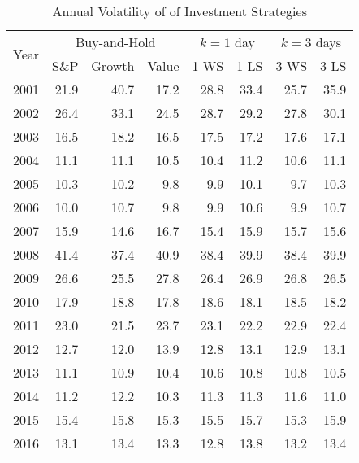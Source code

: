 \documentclass{article}
\begin{document}
\begin{table}[!ht]
    \centering
    \caption{Annual Volatility of of Investment Strategies}
    \medskip
    \begin{tabular}{l | rrr | rr | rr}
    \hline
\multirow{2}{*}{Year} & \multicolumn{3}{c|}{Buy-and-Hold}   
& \multicolumn{2}{c|}{$k=1$ day}  & \multicolumn{2}{c}{$k=3$ days}   \\
 & S\&P & Growth & Value & 1-WS & 1-LS & 3-WS & 3-LS \\ 
     \hline
2001 & 21.9 & \cellcolor{green!25}40.7 & \cellcolor{red!25}17.2 & 28.8 & 33.4 & 25.7 & 35.9 \\
2002 & 26.4 & \cellcolor{green!25}33.1 & \cellcolor{red!25}24.5 & 28.7 & 29.2 & 27.8 & 30.1 \\
2003 & \cellcolor{red!25}16.5 & \cellcolor{green!25}18.2 & 16.5 & 17.5 & 17.2 & 17.6 & 17.1 \\
2004 & 11.1 & 11.1 & 10.5 & \cellcolor{red!25}10.4 & \cellcolor{green!25}11.2 & 10.6 & 11.1 \\
2005 & \cellcolor{green!25}10.3 & 10.2 & 9.8 & 9.9 & 10.1 & \cellcolor{red!25}9.7 & 10.3 \\
2006 & 10.0 & \cellcolor{green!25}10.7 & \cellcolor{red!25}9.8 & 9.9 & 10.6 & 9.9 & 10.7 \\
2007 & 15.9 & \cellcolor{red!25}14.6 & \cellcolor{green!25}16.7 & 15.4 & 15.9 & 15.7 & 15.6 \\
2008 & \cellcolor{green!25}41.4 & \cellcolor{red!25}37.4 & 40.9 & 38.4 & 39.9 & 38.4 & 39.9 \\
2009 & 26.6 & \cellcolor{red!25}25.5 & \cellcolor{green!25}27.8 & 26.4 & 26.9 & 26.8 & 26.5 \\
2010 & 17.9 & \cellcolor{green!25}18.8 & \cellcolor{red!25}17.8 & 18.6 & 18.1 & 18.5 & 18.2 \\
2011 & 23.0 & \cellcolor{red!25}21.5 & \cellcolor{green!25}23.7 & 23.1 & 22.2 & 22.9 & 22.4 \\
2012 & 12.7 & \cellcolor{red!25}12.0 & \cellcolor{green!25}13.9 & 12.8 & 13.1 & 12.9 & 13.1 \\
2013 & \cellcolor{green!25}11.1 & 10.9 & \cellcolor{red!25}10.4 & 10.6 & 10.8 & 10.8 & 10.5 \\
2014 & 11.2 & \cellcolor{green!25}12.2 & \cellcolor{red!25}10.3 & 11.3 & 11.3 & 11.6 & 11.0 \\
2015 & 15.4 & 15.8 & 15.3 & 15.5 & 15.7 & \cellcolor{red!25}15.3 & \cellcolor{green!25}15.9 \\
2016 & 13.1 & 13.4 & 13.3 & \cellcolor{red!25}12.8 & \cellcolor{green!25}13.8 & 13.2 & 13.4 \\

\end{tabular}
\end{table}
\end{document}
